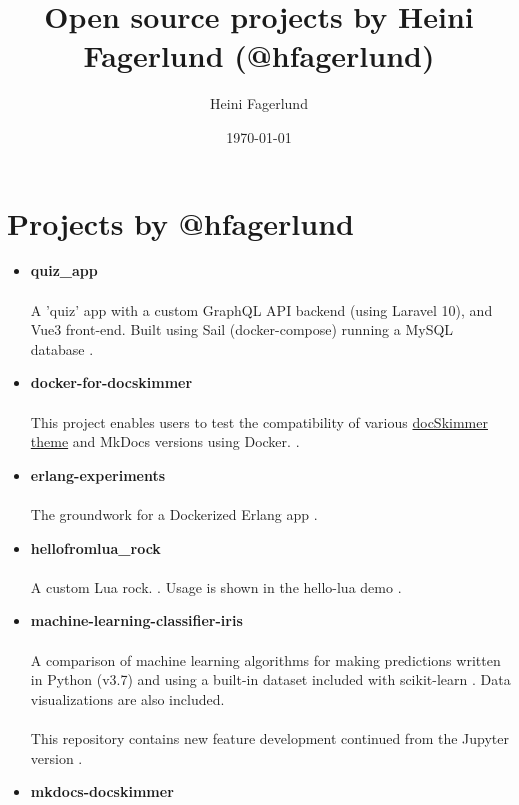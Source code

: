 \documentclass[11pt]{article}
\author{Heini Fagerlund}
\date{\today}
\title{Open source projects by Heini Fagerlund (@hfagerlund)}
\begin{document}
\maketitle

\section{Projects by @hfagerlund}
\label{sec:org4aa91f9}
\begin{itemize}
\item \textbf{quiz\_app}
\paragraph{}
A 'quiz' app with a custom GraphQL API backend (using Laravel 10), and Vue3 front-end. Built using Sail (docker-compose) running a MySQL database \cite{quiz-app}.
\item \textbf{docker-for-docskimmer}
\paragraph{}
This project enables users to test the compatibility of various \href{https://github.com/hfagerlund/mkdocs-docskimmer}{docSkimmer theme} and MkDocs versions using Docker. \cite{docker}.
\item \textbf{erlang-experiments}
\paragraph{}
The groundwork for a Dockerized Erlang app \cite{erlang}.
\item \textbf{hellofromlua\_rock}
\paragraph{}
A custom Lua rock. \cite{luarock}. Usage is shown in the hello-lua demo \cite{lua}.
\item \textbf{machine-learning-classifier-iris}
\paragraph{}
A comparison of machine learning algorithms for making predictions written in Python (v3.7) and using a built-in dataset included with scikit-learn \cite{machinelearning}. Data visualizations are also included.
 \paragraph{}
This repository contains new feature development continued from the Jupyter version \cite{jupyter}.
\item \textbf{mkdocs-docskimmer}

\end{itemize}
\end{document}
